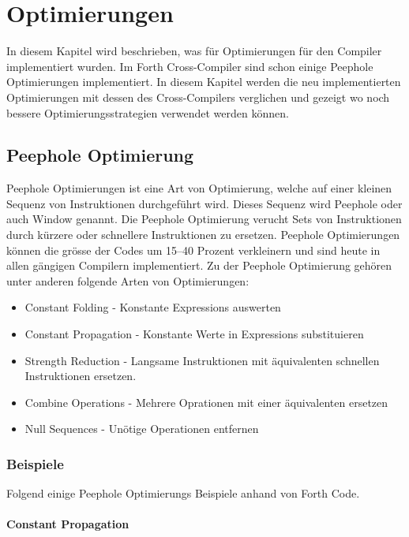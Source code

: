 \chapter{Optimierungen}

In diesem Kapitel wird beschrieben, was für Optimierungen für den Compiler implementiert wurden. Im Forth Cross-Compiler sind schon einige Peephole Optimierungen implementiert. In diesem Kapitel werden die neu implementierten Optimierungen mit dessen des Cross-Compilers verglichen und gezeigt wo noch bessere Optimierungsstrategien verwendet werden können.

\section{Peephole Optimierung}

Peephole Optimierungen ist eine Art von Optimierung, welche auf einer kleinen Sequenz von Instruktionen durchgeführt wird. Dieses Sequenz wird Peephole oder auch Window genannt. Die Peephole Optimierung verucht Sets von Instruktionen durch kürzere oder schnellere Instruktionen zu ersetzen.\cite{peepwiki} Peephole Optimierungen können die grösse der Codes um 15--40 Prozent verkleinern und sind heute in allen gängigen Compilern implementiert.\cite{peepdavidson} Zu der Peephole Optimierung gehören unter anderen folgende Arten von Optimierungen:

\begin{itemize} 
	\item Constant Folding - Konstante Expressions auswerten
	\item Constant Propagation - Konstante Werte in Expressions substituieren
	\item Strength Reduction - Langsame Instruktionen mit äquivalenten schnellen Instruktionen ersetzen.
	\item Combine Operations - Mehrere Oprationen mit einer äquivalenten ersetzen
	\item Null Sequences - Unötige Operationen entfernen\cite{peepwiki}
\end{itemize}

\newpage

\subsection{Beispiele}

Folgend einige Peephole Optimierungs Beispiele anhand von Forth Code.

\subsubsection{Constant Propagation}
\label{constantprogationsection}

